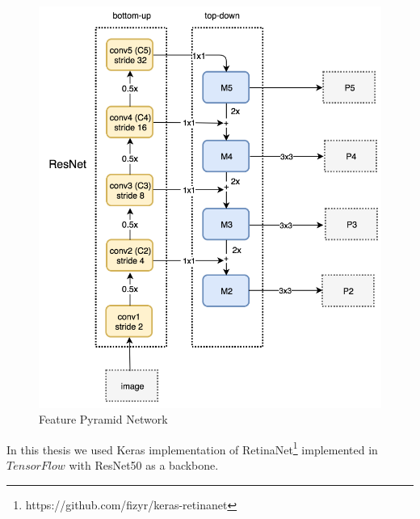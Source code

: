 \documentclass[twoside]{ctuthesis}
\theoremstyle{plain}
\theoremstyle{definition}
\theoremstyle{note}
\begin{document}
\begin{figure}[h]
\caption{Feature Pyramid Network}
\label{fpn}
\includegraphics[width=\textwidth]{images/used_networks/fpn.png}
\end{figure}
In this thesis we used Keras implementation of RetinaNet\footnote{https://github.com/fizyr/keras-retinanet} implemented in $TensorFlow$ with ResNet50 as a backbone. 
\end{document}
